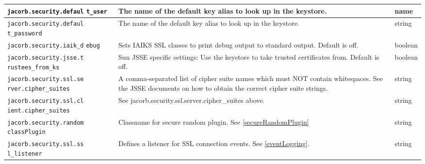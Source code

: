 {{\begin{small}
\begin{longtable}{|p{5cm}|p{9cm}|p{2cm}|}
\hline
\verb"jacorb.security.defaul"
\verb"t_user" & The name of the default key alias to look up in the keystore. & name \\
\hline
\verb"jacorb.security.defaul"
\verb"t_password" & The name of the default key alias to look up in the keystore. & string \\
\hline
\verb"jacorb.security.iaik_d"
\verb"ebug" & Sets IAIKS SSL classes to print debug output to standard output. Default is off. & boolean \\
\hline
\verb"jacorb.security.jsse.t"
\verb"rustees_from_ks" & Sun JSSE specific settings: Use the keystore to take trusted certificates from. Default is off. & boolean \\
\hline
\verb"jacorb.security.ssl.se"
\verb"rver.cipher_suites" & A comma-separated list of cipher suite names which must NOT contain whitespaces. See the JSSE documents on how to obtain the correct cipher suite strings. & string \\
\hline
\verb"jacorb.security.ssl.cl"
\verb"ient.cipher_suites" & See jacorb.security.ssl.server.cipher\_suites above. & string \\
\hline
\verb"jacorb.security.random"
\verb"classPlugin" & Classname for secure random plugin. See \ref{secureRandomPlugin} & string \\
\hline
\verb"jacorb.security.ssl.ss"
\verb"l_listener" & Defines a listener for SSL connection events. See \ref{eventLogging}.
& string \\
\hline
\end{longtable}
\end{small}

}}
